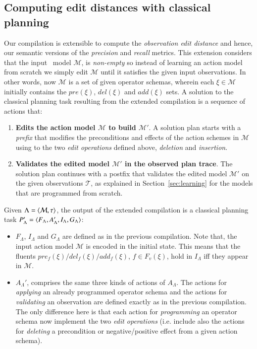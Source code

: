 \subsection{Computing edit distances with classical planning}
Our compilation is extensible to compute the {\em observation edit distance} and hence, our semantic versions of the {\em precision} and {\em recall} metrics. This extension considers that the input \strips\ model $\mathcal{M}$, is {\em non-empty} so instead of learning an action model from scratch we simply edit $\mathcal{M}$ until it satisfies the given input observations. In other words, now $\mathcal{M}$ is a set of given operator schemas, wherein each $\xi\in\mathcal{M}$ initially contains the $pre(\xi)$, $del(\xi)$ and $add(\xi)$ sets. A solution to the classical planning task resulting from the extended compilation is a sequence of actions that:
\begin{enumerate}
\item {\bf Edits the action model $\mathcal{M}$ to build $\mathcal{M}'$}. A solution plan starts with a {\em prefix} that modifies the preconditions and effects of the action schemes in $\mathcal{M}$ using to the two {\em edit operations} defined above, {\em deletion} and {\em insertion}.
\item {\bf Validates the edited model $\mathcal{M}'$ in the observed plan trace}. The solution plan continues with a postfix that validates the edited model $\mathcal{M}'$ on the given observations $\mathcal{T}$, as explained in Section~\ref{sec:learning} for the models that are programmed from scratch.
\end{enumerate}

Given $\Lambda={\langle \mathcal{M},\tau \rangle}$, the output of the extended compilation is a classical planning task $P_{\Lambda}'={\langle F_{\Lambda},A_{\Lambda}',I_{\Lambda},G_{\Lambda} \rangle}$:
\begin{itemize}
\item $F_{\Lambda}$, $I_{\Lambda}$ and $G_{\Lambda}$ are defined as in the previous compilation. Note that, the input action model $\mathcal{M}$ is encoded in the initial state. This means that the fluents $pre_f(\xi)/del_f(\xi)/add_f(\xi)$, $f\in F_v(\xi)$, hold in $I_{\Lambda}$ iff they appear in $\mathcal{M}$.
\item $A_{\Lambda}'$, comprises the same three kinds of actions of $A_{\Lambda}$. The actions for {\em applying} an already programmed operator schema and the actions for {\em validating} an observation are defined exactly as in the previous compilation. The only difference here is that each action for {\em programming} an operator schema now implement the two {\em edit operations} (i.e. include also the actions for {\em deleting} a precondition or negative/positive effect from a given action schema).
\end{itemize}

